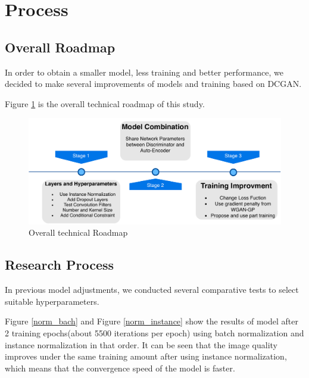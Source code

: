 \section{Process}
\subsection{Overall Roadmap}
In order to obtain a smaller model, less training and better performance,
    we decided to make several improvements of models and training based on DCGAN.

Figure \ref{roadmap} is the overall technical roadmap of this study.

\begin{figure}
    \begin{center}
    \includegraphics[width=\textwidth]{figures/roadmap.pdf}
    \caption{Overall technical Roadmap}
    \label{roadmap}
    \end{center}
\end{figure}


\subsection{Research Process}

In previous model adjustments, we conducted several comparative tests to select suitable hyperparameters.

Figure \ref{norm_bach} and Figure \ref{norm_instance} show the results of model after 2 training epochs(about 5500 iterations per epoch) using batch normalization and instance normalization in that order.
It can be seen that the image quality improves under the same training amount after using instance normalization,
    which means that the convergence speed of the model is faster.

